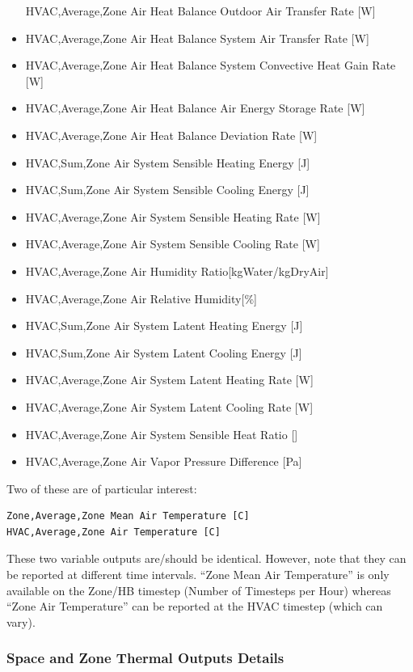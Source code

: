 \begin{itemize}
  HVAC,Average,Zone Air Heat Balance Outdoor Air Transfer Rate {[}W{]}
\item
  HVAC,Average,Zone Air Heat Balance System Air Transfer Rate {[}W{]}
\item
  HVAC,Average,Zone Air Heat Balance System Convective Heat Gain Rate {[}W{]}
\item
  HVAC,Average,Zone Air Heat Balance Air Energy Storage Rate {[}W{]}
\item
  HVAC,Average,Zone Air Heat Balance Deviation Rate {[}W{]}
\item
  HVAC,Sum,Zone Air System Sensible Heating Energy {[}J{]}
\item
  HVAC,Sum,Zone Air System Sensible Cooling Energy {[}J{]}
\item
  HVAC,Average,Zone Air System Sensible Heating Rate {[}W{]}
\item
  HVAC,Average,Zone Air System Sensible Cooling Rate {[}W{]}
\item
  HVAC,Average,Zone Air Humidity Ratio{[}kgWater/kgDryAir{]}
\item
  HVAC,Average,Zone Air Relative Humidity{[}\%{]}
\item
  HVAC,Sum,Zone Air System Latent Heating Energy {[}J{]}
\item
  HVAC,Sum,Zone Air System Latent Cooling Energy {[}J{]}
\item
  HVAC,Average,Zone Air System Latent Heating Rate {[}W{]}
\item
  HVAC,Average,Zone Air System Latent Cooling Rate {[}W{]}
\item
  HVAC,Average,Zone Air System Sensible Heat Ratio {[}{]}
\item
  HVAC,Average,Zone Air Vapor Pressure Difference {[}Pa{]}

\end{itemize}

Two of these are of particular interest:

\begin{lstlisting}
Zone,Average,Zone Mean Air Temperature [C]
HVAC,Average,Zone Air Temperature [C]
\end{lstlisting}

These two variable outputs are/should be identical. However, note that they can be reported at different time intervals. ``Zone Mean Air Temperature'' is only available on the Zone/HB timestep (Number of Timesteps per Hour) whereas ``Zone Air Temperature'' can be reported at the HVAC timestep (which can vary).

\subsubsection{Space and Zone Thermal Outputs Details}

